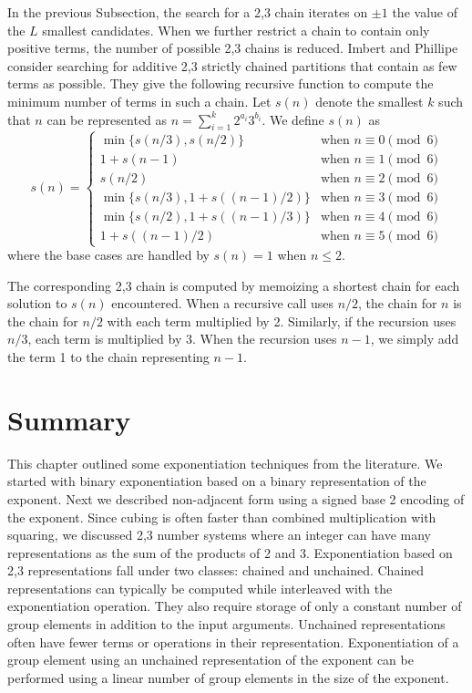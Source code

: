 \documentclass{ucalgthes1}
\theoremstyle{definition}
\begin{document}
In the previous Subsection, the search for a 2,3 chain iterates on $\pm 1$ the value of the $L$ smallest candidates.  When we further restrict a chain to contain only positive terms, the number of possible 2,3 chains is reduced.  Imbert and Phillipe \cite{Imbert2010b} consider searching for additive 2,3 strictly chained partitions that contain as few terms as possible.  They give the following recursive function to compute the minimum number of terms in such a chain. Let $s(n)$ denote the smallest $k$ such that $n$ can be represented as $n = \sum_{i=1}^k 2^{a_i} 3^{b_i}$. We define $s(n)$ as
\begin{equation*}
s(n) = \begin{cases}
	\min\{s(n/3), s(n/2)\} & \textrm{when } n \equiv 0 \pmod 6 \\
	1 + s(n-1) & \textrm{when } n \equiv 1 \pmod 6 \\
	s(n/2) & \textrm{when } n \equiv 2 \pmod 6 \\
	\min\{s(n/3), 1 + s((n-1)/2)\} & \textrm{when } n \equiv 3 \pmod 6 \\ 
	\min\{s(n/2), 1 + s((n-1)/3)\} & \textrm{when } n \equiv 4 \pmod 6 \\
	1 + s((n-1)/2) & \textrm{when } n \equiv 5 \pmod 6
\end{cases}
\end{equation*}
where the base cases are handled by $s(n) = 1$ when $n \le 2$.

The corresponding 2,3 chain is computed by memoizing a shortest chain for each solution to $s(n)$ encountered. When a recursive call uses $n/2$, the chain for $n$ is the chain for $n/2$ with each term multiplied by 2.  Similarly, if the recursion uses $n/3$, each term is multiplied by 3.  When the recursion uses $n-1$, we simply add the term 1 to the chain representing $n-1$.


\section{Summary}

This chapter outlined some exponentiation techniques from the literature.  We started with binary exponentiation based on a binary representation of the exponent.  Next we described non-adjacent form using a signed base 2 encoding of the exponent.  Since cubing is often faster than combined multiplication with squaring, we discussed 2,3 number systems where an integer can have many representations as the sum of the products of 2 and 3.  Exponentiation based on 2,3 representations fall under two classes: chained and unchained.  Chained representations can typically be computed while interleaved with the exponentiation operation.  They also require storage of only a constant number of group elements in addition to the input arguments.  Unchained representations often have fewer terms or operations in their representation.  Exponentiation of a group element using an unchained representation of the exponent can be performed using a linear number of group elements in the size of the exponent.
\end{document}
